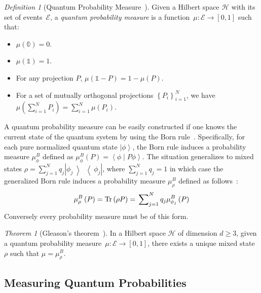 \documentclass{article}
\theoremstyle{remark}
\newtheorem{definition}{Definition}
\newtheorem{thm}{Theorem}
\newcommand{\Hilb}{\mathcal{H}}
\newcommand{\events}{\ensuremath{\mathcal{E}}}
\newcommand{\ket}[1]{{\left\vert{#1}\right\rangle}}
\newcommand{\op}[2]{\ensuremath{\left\vert{#1}\middle\rangle\middle\langle{#2}\right\vert}}
\newcommand{\proj}[1]{\op{#1}{#1}}
\newcommand{\ip}[2]{\ensuremath{\left\langle{#1}\middle\vert{#2}\right\rangle}}
\newcommand{\Tr}{\mathop{\mathrm{Tr}}\nolimits}
\begin{document}
\begin{definition}[Quantum Probability Measure~\cite{10.2307/2308516,gleason1957,Redhead1987-REDINA,Maassen2010}]\label{def:QuantumProbabilitySpace}
Given a Hilbert space $\Hilb$ with its set of events~$\events$,
a \emph{quantum probability measure} is a function~$\mu:\events\rightarrow[0,1]$
such that: 
\begin{itemize}
\item $\mu(\mathbb{0})=0$. 
\item $\mu(\mathbb{1})=1$. 
\item For any projection $P$, $\mu\left(\mathbb{1}-P\right)=1-\mu\left(P\right)$.
\item For a set of mutually orthogonal projections $\left\{ P_{i}\right\} _{i=1}^{N}$,
we have $\mu\left(\sum_{i=1}^{N}P_{i}\right)=\sum_{i=1}^{N}\mu\left(P_{i}\right)$.
\end{itemize}
\end{definition}

\noindent A quantum probability measure can be easily constructed if
one knows the current state of the quantum system by using the Born
rule~\cite{Born1983,Mermin2007,Jaeger2007}.  Specifically, for each
pure normalized quantum state $\ket{\phi}$, the Born rule induces a
probability measure $\mu_{\phi}^{B}$ defined as
$\mu_{\phi}^{B}(P)=\ip{\phi}{P\phi}$. The situation generalizes to
mixed states $\rho = \sum_{j=1}^{N}q_{j}\proj{\phi_{j}}$, where
$\sum_{j=1}^{N}q_{j}=1$ in which case the generalized Born rule
induces a probability measure $\mu_{\rho}^{B}$ defined
as follows~\cite{peres1995quantum,544199,Jaeger2007}:
\[
\mu_{\rho}^{B}\left(P\right) = 
\Tr\left(\rho P\right) = 
\sideset{}{_{j=1}^{N}}\sum q_{j}\mu_{\phi_{j}}^{B}\left(P\right)
\]
Conversely every probability measure must be of this form.

\begin{thm}[Gleason's
  theorem~\cite{gleason1957,Redhead1987-REDINA,peres1995quantum}]\label{cor:Gleason's}In
a Hilbert space $\Hilb$ of dimension $d\geq3$, given a quantum probability
measure~$\mu:\events\rightarrow[0,1]$, there exists a unique mixed
state~$\rho$ such that $\mu=\mu_{\rho}^{B}$.
\end{thm}

\subsection{Measuring Quantum Probabilities}
\end{document}
